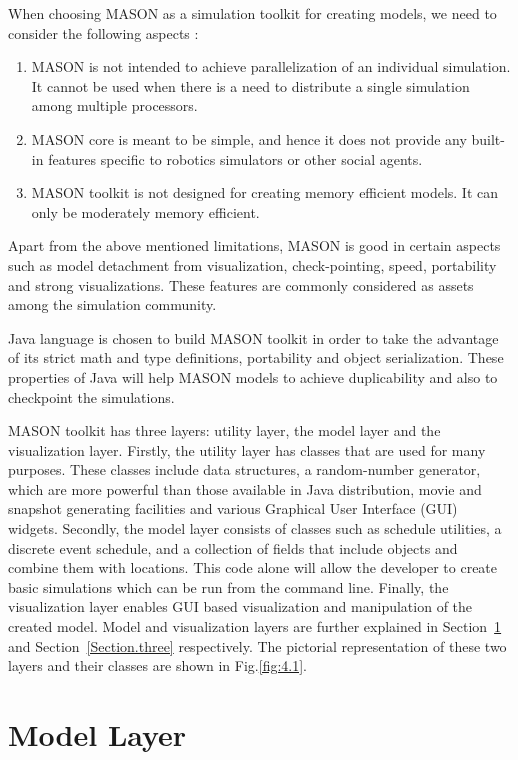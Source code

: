 When choosing MASON as a simulation toolkit for creating models, we need to consider the following aspects :

\begin{enumerate}
\item MASON is not intended to achieve parallelization of an individual simulation. It cannot be used when there is a need to distribute a single simulation among multiple processors.   
\item MASON core is meant to be simple, and hence it does not provide any built-in features specific to robotics simulators or other social agents.
\item MASON toolkit is not designed for creating memory efficient models. It can only be moderately memory efficient. 
\end{enumerate}

Apart from the above mentioned limitations, MASON is good in certain aspects such as model detachment from visualization, check-pointing, speed,  portability and strong visualizations. These features are commonly considered as assets among the simulation community.

Java language is chosen to build MASON toolkit in order to take the advantage of its strict math and type definitions, portability and object serialization. These properties of Java will help MASON models to achieve duplicability and also to checkpoint the simulations.

MASON toolkit has three layers: utility layer, the model layer and the visualization layer. Firstly, the utility layer has classes that are used for many purposes. These classes include data structures, a random-number generator, which are more powerful than those available in Java distribution, movie and snapshot generating facilities and various Graphical User Interface (GUI) widgets. Secondly, the model layer consists of classes such as schedule utilities, a discrete event schedule, and a collection of fields that include objects and combine them with locations. This code alone will allow the developer to create basic simulations which can be run from the command line. Finally, the visualization layer enables GUI based visualization and manipulation of the created model. Model and visualization layers are  further explained in Section~\ref{Section.two} and Section~\ref{Section.three} respectively. The pictorial representation of these two layers and their classes are shown in Fig.\ref{fig:4.1}.

\section{Model Layer}
\label{Section.two}

